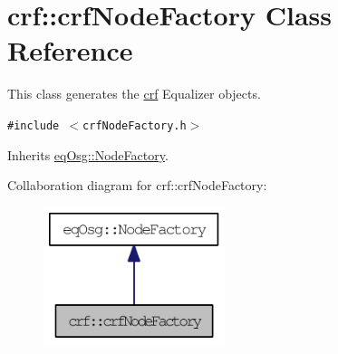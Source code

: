 \hypertarget{a00005}{
\section{crf::crfNodeFactory Class Reference}
\label{a00005}
}
This class generates the \hyperlink{a00043}{crf} Equalizer objects.  


{\tt \#include $<$crfNodeFactory.h$>$}

Inherits \hyperlink{a00013}{eqOsg::NodeFactory}.

Collaboration diagram for crf::crfNodeFactory:\nopagebreak
\begin{figure}[H]
\begin{center}
\leavevmode
\includegraphics[width=150pt]{a00073}
\end{center}
\end{figure}
